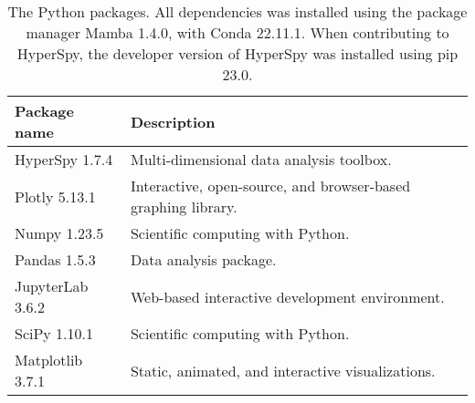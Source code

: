 \begin{table}[hbtp]
    \begin{center}
        \caption{
            The Python packages.
            All dependencies was installed using the package manager Mamba 1.4.0, with Conda 22.11.1.
            When contributing to HyperSpy, the developer version of HyperSpy was installed using pip 23.0.
        }
        \renewcommand*{\arraystretch}{1.2}
        \label{tab:method:packages}
        \begin{tabular}{p{4cm}p{10.6cm}}
            \hline
            \textbf{Package name} & \textbf{Description}                                          \\
            \hline
            HyperSpy 1.7.4        & Multi-dimensional data analysis toolbox.                      \\
            Plotly 5.13.1         & Interactive, open-source, and browser-based graphing library. \\
            Numpy 1.23.5          & Scientific computing with Python.                             \\
            Pandas 1.5.3          & Data analysis package.                                        \\
            JupyterLab 3.6.2      & Web-based interactive development environment.                \\
            SciPy 1.10.1          & Scientific computing with Python.                             \\
            Matplotlib 3.7.1      & Static, animated, and interactive visualizations.             \\
            \hline
        \end{tabular}
    \end{center}
\end{table}